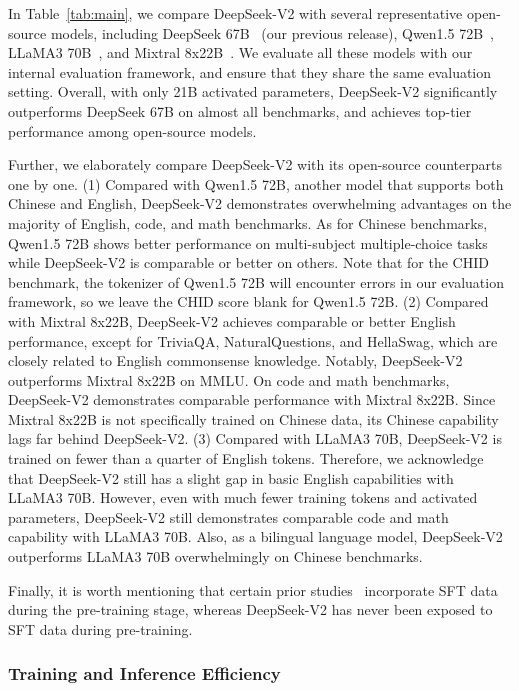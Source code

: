 In Table~\ref{tab:main}, we compare DeepSeek-V2 with several representative open-source models, including DeepSeek 67B~\citep{deepseek1} (our previous release), Qwen1.5 72B~\citep{qwen}, LLaMA3 70B~\citep{llama3}, and Mixtral 8x22B~\citep{mixtral8x22b}. We evaluate all these models with our internal evaluation framework, and ensure that they share the same evaluation setting. Overall, with only 21B activated parameters, DeepSeek-V2 significantly outperforms DeepSeek 67B on almost all benchmarks, and achieves top-tier performance among open-source models. 

Further, we elaborately compare DeepSeek-V2 with its open-source counterparts one by one. (1) Compared with Qwen1.5 72B, another model that supports both Chinese and English, DeepSeek-V2 demonstrates overwhelming advantages on the majority of English, code, and math benchmarks. As for Chinese benchmarks, Qwen1.5 72B shows better performance on multi-subject multiple-choice tasks while DeepSeek-V2 is comparable or better on others. Note that for the CHID benchmark, the tokenizer of Qwen1.5 72B will encounter errors in our evaluation framework, so we leave the CHID score blank for Qwen1.5 72B. (2) Compared with Mixtral 8x22B, DeepSeek-V2 achieves comparable or better English performance, except for TriviaQA, NaturalQuestions, and HellaSwag, which are closely related to English commonsense knowledge. Notably, DeepSeek-V2 outperforms Mixtral 8x22B on MMLU. On code and math benchmarks, DeepSeek-V2 demonstrates comparable performance with Mixtral 8x22B. Since Mixtral 8x22B is not specifically trained on Chinese data, its Chinese capability lags far behind DeepSeek-V2. (3) Compared with LLaMA3 70B, DeepSeek-V2 is trained on fewer than a quarter of English tokens. Therefore, we acknowledge that DeepSeek-V2 still has a slight gap in basic English capabilities with LLaMA3 70B. However, even with much fewer training tokens and activated parameters, DeepSeek-V2 still demonstrates comparable code and math capability with LLaMA3 70B. Also, as a bilingual language model, DeepSeek-V2 outperforms LLaMA3 70B overwhelmingly on Chinese benchmarks. 

Finally, it is worth mentioning that certain prior studies~\citep{minicpm} incorporate SFT data during the pre-training stage, whereas DeepSeek-V2 has never been exposed to SFT data during pre-training. 

\subsubsection{Training and Inference Efficiency}

